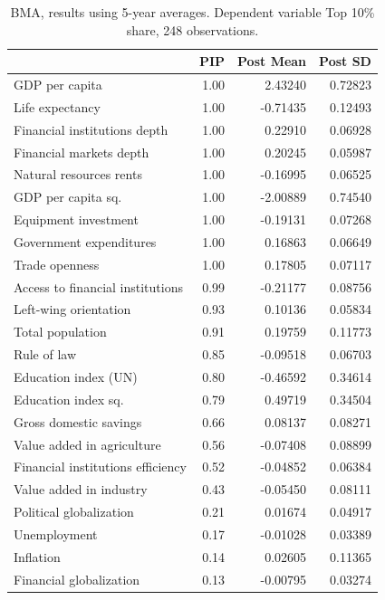 \documentclass[preprint, nonatbib, 10pt]{elsarticle}
\begin{document}
\begin{table}[ht!]
    \centering
    \small
    \caption{BMA, results using 5-year averages. Dependent variable Top 10\% share, 248 observations.}\label{res:5y_top10}
    \begin{tabular}{lrrr}
      \toprule
     & PIP & Post Mean & Post SD \\
      \midrule
      GDP per capita & 1.00 & 2.43240 & 0.72823 \\ 
      Life expectancy & 1.00 & -0.71435 & 0.12493 \\
      Financial institutions depth & 1.00 & 0.22910 & 0.06928 \\
      Financial markets depth & 1.00 & 0.20245 & 0.05987 \\ 
      Natural resources rents & 1.00 & -0.16995 & 0.06525 \\ 
      GDP per capita sq. & 1.00 & -2.00889 & 0.74540 \\ 
      Equipment investment & 1.00 & -0.19131 & 0.07268 \\ 
      Government expenditures & 1.00 & 0.16863 & 0.06649 \\
      Trade openness & 1.00 & 0.17805 & 0.07117 \\ 
      Access to financial institutions & 0.99 & -0.21177 & 0.08756 \\ 
      Left-wing orientation & 0.93 & 0.10136 & 0.05834 \\ 
      Total population & 0.91 & 0.19759 & 0.11773 \\ 
      Rule of law & 0.85 & -0.09518 & 0.06703 \\ 
      Education index (UN) & 0.80 & -0.46592 & 0.34614 \\
      Education index sq. & 0.79 & 0.49719 & 0.34504 \\ 
      Gross domestic savings & 0.66 & 0.08137 & 0.08271 \\ 
      Value added in agriculture & 0.56 & -0.07408 & 0.08899 \\ 
      Financial institutions efficiency & 0.52 & -0.04852 & 0.06384 \\
      Value added in industry & 0.43 & -0.05450 & 0.08111 \\ 
      Political globalization & 0.21 & 0.01674 & 0.04917 \\ 
      Unemployment & 0.17 & -0.01028 & 0.03389 \\ 
      Inflation & 0.14 & 0.02605 & 0.11365 \\
      Financial globalization & 0.13 & -0.00795 & 0.03274 \\ 

\end{tabular}
\end{table}
\end{document}
